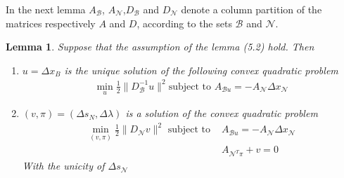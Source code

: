 \documentclass[a4paper,10 pt,titlepage,twoside]{book}
\theoremstyle{plain}
\newtheorem{lem}[thm]{Lemma}
\theoremstyle{definition}
\theoremstyle{remark}
\begin{document}
In the next lemma $A_{\mathcal{B}}$, $A_{\mathcal{N}}$,$D_{\mathcal{B}}$ and $D_{\mathcal{N}}$ denote a column partition of the matrices respectively $A$ and $D$, according to the sets $\mathcal{B}$ and $\mathcal{N}$.
\begin{lem}
	Suppose that the assumption of the lemma (5.2) hold. Then
	\begin{enumerate}
		\item $u = \Delta x_{B}$ is the unique solution of the following convex quadratic problem
		\begin{align} \label{(U)}
			\min\limits_{u}\frac{1}{2}\lVert D_{\mathcal{B}}^{-1}u\rVert^{2} \text{subject to }A_{\mathcal{B}u} = -A_{\mathcal{N}}\Delta x_{\mathcal{N}}
		\end{align}
			\item $(v, \pi) = (\Delta s_{N}, \Delta \lambda)$ is a solution of the convex quadratic problem
	\begin{align}
		\min\limits_{(v, \pi)}\frac{1}{2}\lVert D_{\mathcal{N}}v\rVert^{2} \text{ subject to } &A_{\mathcal{B}u} = -A_{\mathcal{N}}\Delta x_{\mathcal{N}}\\
		&A_{\mathcal{N}^{T}\pi}+ v =0		 
	\end{align}
		With the unicity of $\Delta s_{\mathcal{N}}$
	\end{enumerate} 
\end{lem} 
\end{document}
